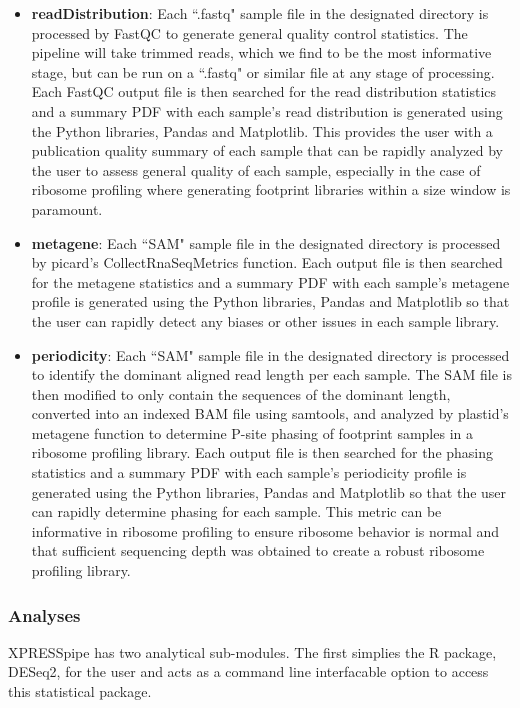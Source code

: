 \documentclass[11pt, a4paper, oneside]{article}
\begin{document}
\begin{itemize}
  \item \textbf{readDistribution}: Each ``.fastq" sample file in the designated directory is processed by FastQC{} to generate general quality control statistics. The pipeline will take trimmed reads, which we find to be the most informative stage, but can be run on a ``.fastq" or similar file at any stage of processing. Each FastQC output file is then searched for the read distribution statistics and a summary PDF with each sample's read distribution is generated using the Python libraries, Pandas{} and Matplotlib{}. This provides the user with a publication quality summary of each sample that can be rapidly analyzed by the user to assess general quality of each sample, especially in the case of ribosome profiling where generating footprint libraries within a size window is paramount.
  \item \textbf{metagene}: Each ``SAM" sample file in the designated directory is processed by picard's CollectRnaSeqMetrics function{}. Each output file is then searched for the metagene statistics and a summary PDF with each sample's metagene profile is generated using the Python libraries, Pandas{} and Matplotlib{} so that the user can rapidly detect any biases or other issues in each sample library.
  \item \textbf{periodicity}: Each ``SAM" sample file in the designated directory is processed to identify the dominant aligned read length per each sample. The SAM file is then modified to only contain the sequences of the dominant length, converted into an indexed BAM file using samtools{}, and analyzed by plastid's metagene function{} to determine P-site phasing of footprint samples in a ribosome profiling library. Each output file is then searched for the phasing statistics and a summary PDF with each sample's periodicity profile is generated using the Python libraries, Pandas{} and Matplotlib{} so that the user can rapidly determine phasing for each sample. This metric can be informative in ribosome profiling to ensure ribosome behavior is normal and that sufficient sequencing depth was obtained to create a robust ribosome profiling library.
\end{itemize}

\subsubsection{Analyses}
XPRESSpipe has two analytical sub-modules. The first simplies the R package, DESeq2{}, for the user and acts as a command line interfacable option to access this statistical package.
\end{document}
